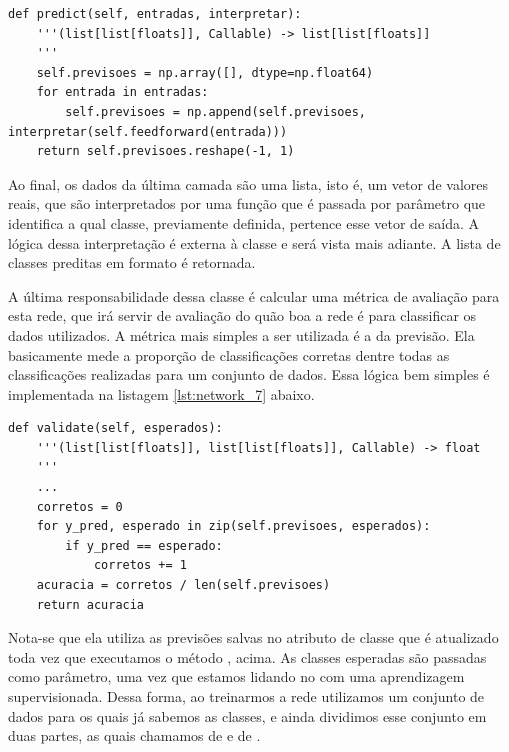 \begin{scriptsize}
\estiloR
\begin{lstlisting}[caption={Trecho da classe \eng{Network}}, label={lst:network_6}, escapeinside={\%}]
def predict(self, entradas, interpretar):
    '''(list[list[floats]], Callable) -> list[list[floats]]
    '''
    self.previsoes = np.array([], dtype=np.float64)
    for entrada in entradas:
        self.previsoes = np.append(self.previsoes, interpretar(self.feedforward(entrada)))
    return self.previsoes.reshape(-1, 1)
\end{lstlisting}
\end{scriptsize}

Ao final, os dados da última camada são uma lista, isto é, um vetor de valores reais, que são interpretados por uma função que é passada por parâmetro que identifica a qual classe, previamente definida, pertence esse vetor de saída. A lógica dessa interpretação é externa à classe  e será vista mais adiante. A lista de classes preditas em formato  é retornada.

A última responsabilidade dessa classe é calcular uma métrica de avaliação para esta rede, que irá servir de avaliação do quão boa a rede é para classificar os dados utilizados. A métrica mais simples a ser utilizada é a  da previsão. Ela basicamente mede a proporção de classificações corretas dentre todas as classificações realizadas para um conjunto de dados. Essa lógica bem simples é implementada na listagem \ref{lst:network_7} abaixo. 

\begin{scriptsize}
\estiloR
\begin{lstlisting}[caption={Trecho da classe \eng{Network}}, label={lst:network_7}, escapeinside={\%}]
def validate(self, esperados):
    '''(list[list[floats]], list[list[floats]], Callable) -> float
    '''
    ...
    corretos = 0
    for y_pred, esperado in zip(self.previsoes, esperados):
        if y_pred == esperado:
            corretos += 1
    acuracia = corretos / len(self.previsoes)
    return acuracia
\end{lstlisting}
\end{scriptsize}

Nota-se que ela utiliza as previsões salvas no atributo de classe que é atualizado toda vez que executamos o método , acima. As classes esperadas são passadas como parâmetro, uma vez que estamos lidando no  com uma aprendizagem supervisionada. Dessa forma, ao treinarmos a rede utilizamos um conjunto de dados para os quais já sabemos as classes, e ainda dividimos esse conjunto em duas partes, as quais chamamos de  e de .

